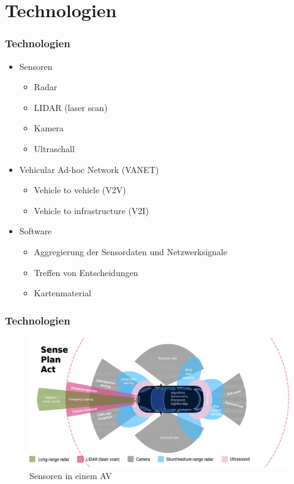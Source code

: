 \section{Technologien}

\begin{frame}
    \frametitle{Technologien}

    \begin{itemize}
        \item Sensoren \cite{smith2015automated}
        \begin{itemize}
            \item Radar
            \item LIDAR (laser scan)
            \item Kamera
            \item Ultraschall
        \end{itemize}
    
        \item Vehicular Ad-hoc Network (VANET) \cite{10.1007/978-3-642-31368-4_6}
        \begin{itemize}
            \item Vehicle to vehicle (V2V)
            \item Vehicle to infrastructure (V2I)
        \end{itemize}
        
        \item Software
        \begin{itemize}
            \item Aggregierung der Sensordaten und Netzwerksignale
            \item Treffen von Entscheidungen
            \item Kartenmaterial
        \end{itemize}
    \end{itemize}
\end{frame}

\begin{frame}
    \frametitle{Technologien}

    \begin{figure}[H]
        \centering
        \includegraphics[width=1.0\textwidth]{resources/images/sensors-av.png}
        \caption{Sensoren in einem AV \cite{sensors_img}}
    \end{figure}
\end{frame}

